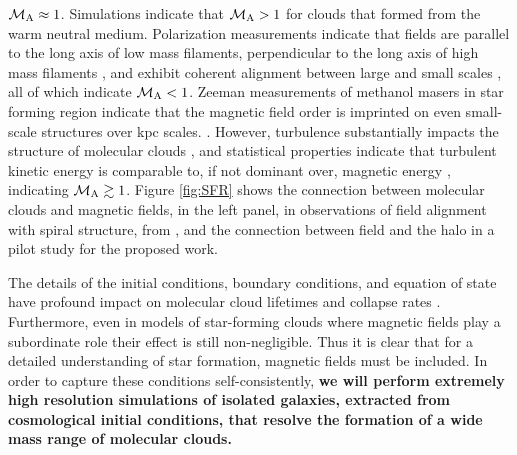 $\mathcal{M_{\rm{A}}}\approx 1$.  Simulations \citep{deAvillez05, Kritsuk11c}
 indicate that
$\mathcal{M_{\rm{A}}}>1$ for clouds that formed from the warm neutral medium. 
Polarization
measurements indicate that fields are parallel to the long axis of low mass
filaments, 
perpendicular to the long axis of high mass filaments \citep{Li13}, and exhibit coherent
alignment between large and small scales \citep{Li09}, all of which indicate
$\mathcal{M_{\rm{A}}}<1$.
Zeeman measurements of methanol masers in star forming
region indicate that the
magnetic field order is imprinted on even small-scale structures over kpc
scales.
\citep{Green12}.  
However,
 turbulence substantially impacts the
structure of molecular clouds \citep[see, e.g.,][]{Elmegreen04, MacLow04}, and statistical
properties indicate that turbulent kinetic energy is comparable to, if not dominant over,
magnetic energy \citep{Padoan04, Heyer12}, indicating $\mathcal{M_{\rm{A}}}\gtrsim 1$.
Figure \ref{fig:SFR} shows the connection between molecular clouds and magnetic
fields, in the left panel, in observations of field alignment with spiral
structure, from \citet{2011Natur.479..499L}, and the connection between field
and the halo in a pilot study for the proposed work.

 The details of the initial conditions, boundary conditions, and
equation of state have profound impact on molecular cloud lifetimes and collapse rates
\citep{Federrath12, Collins12, Rey-Raposo14}.
Furthermore, even in
models of star-forming clouds where magnetic fields play a subordinate role their
effect is still non-negligible.  
Thus it is clear that for a
detailed understanding of star formation, magnetic fields must be included.
In order to capture these conditions self-consistently, \textbf{we will
perform extremely high resolution simulations of
isolated galaxies, extracted from cosmological initial conditions, that resolve the formation of a wide mass range of
molecular clouds.} 




